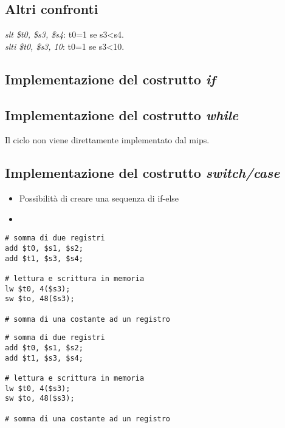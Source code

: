 \documentclass[class=book, crop=false]{standalone}
\begin{document}
\subsection{Altri confronti}
\emph{slt \$t0, \$s3, \$s4}: t0=1 se s3<s4.\\
\emph{slti \$t0, \$s3, 10}: t0=1 se s3<10.\\


\subsection{Implementazione del costrutto \emph{if}}

\subsection{Implementazione del costrutto \emph{while}}
Il ciclo non viene direttamente implementato dal mips.\\

\subsection{Implementazione del costrutto \emph{switch/case}}
\begin{itemize}
	\item Possibilità di creare una sequenza di if-else
	\item
\end{itemize}

\begin{verbatim}
# somma di due registri
add $t0, $s1, $s2;
add $t1, $s3, $s4;

# lettura e scrittura in memoria
lw $t0, 4($s3);
sw $to, 48($s3);

# somma di una costante ad un registro
\end{verbatim}
\begin{verbatim}
# somma di due registri
add $t0, $s1, $s2;
add $t1, $s3, $s4;

# lettura e scrittura in memoria
lw $t0, 4($s3);
sw $to, 48($s3);

# somma di una costante ad un registro
\end{verbatim}
\end{document}
